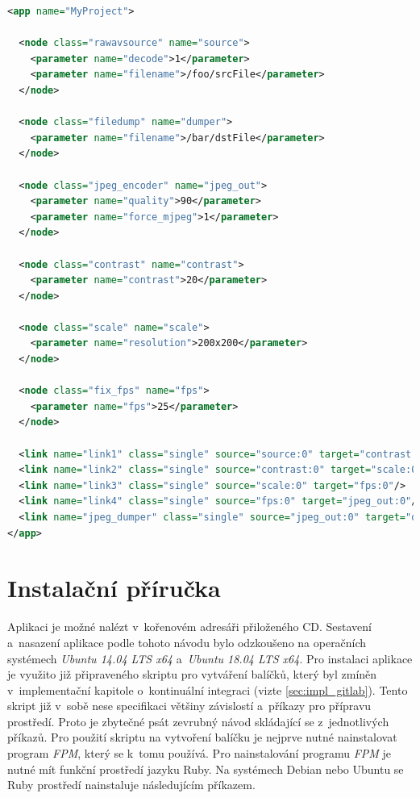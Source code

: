 \documentclass[thesis=M,czech]{FITthesis}[2012/06/26]
\begin{document}
\begin{lstlisting}[language=XML]
<app name="MyProject">

  <node class="rawavsource" name="source">
	<parameter name="decode">1</parameter>
	<parameter name="filename">/foo/srcFile</parameter>
  </node>

  <node class="filedump" name="dumper">
	<parameter name="filename">/bar/dstFile</parameter>
  </node>

  <node class="jpeg_encoder" name="jpeg_out">
    <parameter name="quality">90</parameter>
    <parameter name="force_mjpeg">1</parameter>
  </node>

  <node class="contrast" name="contrast">
	<parameter name="contrast">20</parameter>
  </node>

  <node class="scale" name="scale">
	<parameter name="resolution">200x200</parameter>
  </node>

  <node class="fix_fps" name="fps">
	<parameter name="fps">25</parameter>
  </node>

  <link name="link1" class="single" source="source:0" target="contrast:0"/>
  <link name="link2" class="single" source="contrast:0" target="scale:0"/>
  <link name="link3" class="single" source="scale:0" target="fps:0"/>
  <link name="link4" class="single" source="fps:0" target="jpeg_out:0"/>
  <link name="jpeg_dumper" class="single" source="jpeg_out:0" target="dumper:0"/>
</app>
\end{lstlisting}

\section{Instalační příručka} \label{sec:impl_prirucka}
Aplikaci je možné nalézt v~kořenovém adresáři přiloženého CD. Sestavení a~nasazení aplikace podle tohoto návodu bylo odzkoušeno na operačních systémech \textit{Ubuntu 14.04 LTS x64} a~\textit{Ubuntu 18.04 LTS x64}. Pro instalaci aplikace je využito již připraveného skriptu pro vytváření balíčků, který byl zmíněn v~implementační kapitole o~kontinuální integraci (vizte \ref{sec:impl_gitlab}). Tento skript již v~sobě nese specifikaci většiny závislostí a~příkazy pro přípravu prostředí. Proto je zbytečné psát zevrubný návod skládající se z~jednotlivých příkazů. Pro použití skriptu na vytvoření balíčku je nejprve nutné nainstalovat program \textit{FPM}, který se k~tomu používá. Pro nainstalování programu \textit{FPM} je nutné mít funkční prostředí jazyku Ruby. Na systémech Debian nebo Ubuntu se Ruby prostředí nainstaluje následujícím příkazem.\\
\end{document}
